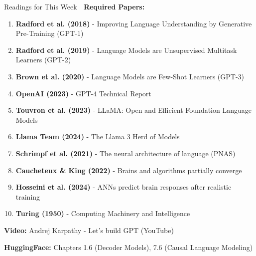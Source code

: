 \documentclass[aspectratio=169]{beamer}
\begin{document}
\begin{frame}{Readings for This Week 📖}
\textbf{Required Papers:}

\vspace{0.5em}

\begin{enumerate}
    \item \textbf{Radford et al. (2018)} - Improving Language Understanding by Generative Pre-Training (GPT-1)

    \item \textbf{Radford et al. (2019)} - Language Models are Unsupervised Multitask Learners (GPT-2)

    \item \textbf{Brown et al. (2020)} - Language Models are Few-Shot Learners (GPT-3)

    \item \textbf{OpenAI (2023)} - GPT-4 Technical Report

    \item \textbf{Touvron et al. (2023)} - LLaMA: Open and Efficient Foundation Language Models

    \item \textbf{Llama Team (2024)} - The Llama 3 Herd of Models

    \item \textbf{Schrimpf et al. (2021)} - The neural architecture of language (PNAS)

    \item \textbf{Caucheteux \& King (2022)} - Brains and algorithms partially converge

    \item \textbf{Hosseini et al. (2024)} - ANNs predict brain responses after realistic training

    \item \textbf{Turing (1950)} - Computing Machinery and Intelligence
\end{enumerate}

\vspace{0.5em}

\textbf{Video:} Andrej Karpathy - Let's build GPT (YouTube)

\textbf{HuggingFace:} Chapters 1.6 (Decoder Models), 7.6 (Causal Language Modeling)
\end{frame}
\end{document}
